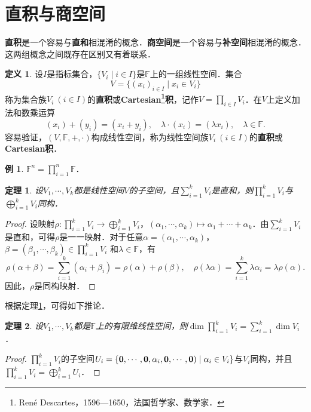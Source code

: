 \documentclass[a4paper,fontset=windows]{ctexbook}
\newtheorem{theorem}{定理}[chapter]
\theoremstyle{definition}
\newtheorem{definition}{定义}[chapter]
\newtheorem{example}{例}[chapter]
\begin{document}
\clearpage\section{直积与商空间}

{\bf 直积}是一个容易与{\bf 直和}相混淆的概念．{\bf 商空间}是一个容易与{\bf 补空间}相混淆的概念．这两组概念之间既存在区别又有着联系．

\begin{definition}
设$I$是指标集合，$\{V_i\mid i\in I\}$是$\mathbb{F}$上的一组线性空间．集合
$$V=\{(x_i)_{i\in I}\mid x_i\in V_i\}$$
称为集合族$V_i~(i\in I)$的{\bf 直积}或{\bf Cartesian\footnote{Ren\'e Descartes，1596—1650，法国哲学家、数学家．}积}，记作$V=\prod\limits_{i\in I}V_i$．在$V$上定义加法和数乘运算
$$(x_i)+(y_i)=(x_i+y_i),\quad\lambda\cdot(x_i)=(\lambda x_i),\quad\lambda\in\mathbb{F}.$$
容易验证，$(V,\mathbb{F},+,\cdot)$构成线性空间，称为线性空间族$V_i~(i\in I)$的{\bf 直积}或{\bf Cartesian积}．
\end{definition}

\begin{example}
$\mathbb{F}^n=\prod\limits_{i=1}^n\mathbb{F}$．
\end{example}

\begin{theorem}\label{thm8.20}
设$V_1,\cdots,V_k$都是线性空间$V$的子空间，且$\sum\limits_{i=1}^kV_i$是直和，则$\prod\limits_{i=1}^kV_i$与$\bigoplus\limits_{i=1}^kV_i$同构．
\end{theorem}

\begin{proof}
设映射$\rho:\prod\limits_{i=1}^kV_i\to\bigoplus\limits_{i=1}^kV_i$，$(\alpha_1,\cdots,\alpha_k)\mapsto\alpha_1+\cdots+\alpha_k$．由$\sum\limits_{i=1}^kV_i$是直和，可得$\rho$是一一映射．对于任意$\alpha=(\alpha_1,\cdots,\alpha_k)$，$\beta=(\beta_1,\cdots,\beta_k)\in\prod\limits_{i=1}^kV_i$ 和$\lambda\in\mathbb{F}$，有
$$\rho(\alpha+\beta)=\sum_{i=1}^k(\alpha_i+\beta_i)=\rho(\alpha)+\rho(\beta),\quad\rho(\lambda\alpha)=\sum_{i=1}^k\lambda\alpha_i=\lambda\rho(\alpha).$$
因此，$\rho$是同构映射．
\end{proof}

根据定理\ref{thm8.20}，可得如下推论．

\begin{theorem}
设$V_1,\cdots,V_k$都是$\mathbb{F}$上的有限维线性空间，则$\dim\prod\limits_{i=1}^kV_i=\sum\limits_{i=1}^k\dim V_i$．
\end{theorem}

\begin{proof}
$\prod\limits_{i=1}^kV_i$的子空间$U_i=\{{\bf 0,\cdots,0},\alpha_i,{\bf 0,\cdots,0})\mid\alpha_i\in V_i\}$与$V_i$同构，并且$\prod\limits_{i=1}^kV_i=\bigoplus\limits_{i=1}^kU_i$．
\end{proof}
\end{document}
